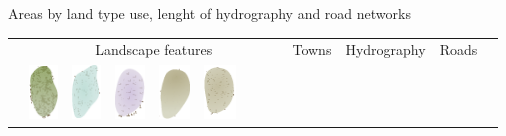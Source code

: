 \documentclass[portrait,a0]{sciposter}
\begin{document}
\begin{minipage}[b]{\textwidth}
\begin{multicols}{3}
    \footnotesize
    \begin{center}
      \captionsetup{type=table}
      \caption{Areas by land type use, lenght of hydrography and road networks }\label{tab:stats}
      \setcellgapes{2pt}
      \begin{tabular}{l|cccccccc|c|ccccc|c|c}
        & \multicolumn{8}{c|}{Landscape features}
        & Towns
        & \multicolumn{5}{c|}{Hydrography}
        & Roads
        &\\
        &\includegraphics[height=40pt]{gfx/foret_couleur.png}
        &\includegraphics[height=40pt]{gfx/marais_couleur.png}
        &\includegraphics[height=40pt]{gfx/vigne_couleur.png}
        &\includegraphics[height=40pt]{gfx/landes_couleur.png}
        &\includegraphics[height=40pt]{gfx/broussailles_couleur.png}

\end{tabular}
\end{center}
\end{multicols}
\end{minipage}
\end{document}
